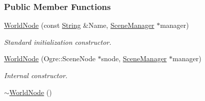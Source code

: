 \subsubsection*{Public Member Functions}
\begin{DoxyCompactItemize}
\item 
\hyperlink{classphys_1_1WorldNode_a02ab92f8a5f9da35926ef133a11a441e}{WorldNode} (const \hyperlink{namespacephys_aa03900411993de7fbfec4789bc1d392e}{String} \&Name, \hyperlink{classphys_1_1SceneManager}{SceneManager} $\ast$manager)
\begin{DoxyCompactList}\small\item\em Standard initialization constructor. \item\end{DoxyCompactList}\item 
\hyperlink{classphys_1_1WorldNode_ae813a2aa737980824725b1909372484e}{WorldNode} (Ogre::SceneNode $\ast$snode, \hyperlink{classphys_1_1SceneManager}{SceneManager} $\ast$manager)
\begin{DoxyCompactList}\small\item\em Internal constructor. \item\end{DoxyCompactList}\item 
\hypertarget{classphys_1_1WorldNode_a357c18b6e04a9ae0d0855841a3c774b2}{
\hyperlink{classphys_1_1WorldNode_a357c18b6e04a9ae0d0855841a3c774b2}{$\sim$WorldNode} ()}
\label{d2/d3e/classphys_1_1WorldNode_a357c18b6e04a9ae0d0855841a3c774b2}


\end{DoxyCompactItemize}
